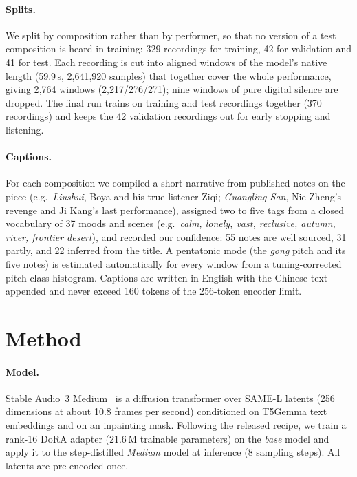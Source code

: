 \documentclass[11pt]{article}
\begin{document}
\paragraph{Splits.} We split by composition rather than by performer, so that no version of a test composition is
heard in training: 329 recordings for training, 42 for validation and 41 for test. Each recording is cut into
aligned windows of the model's native length (59.9\,s, 2{,}641{,}920 samples) that together cover the whole
performance, giving 2{,}764 windows (2{,}217/276/271); nine windows of pure digital silence are dropped. The
final run trains on training and test recordings together (370 recordings) and keeps the 42 validation
recordings out for early stopping and listening.

\paragraph{Captions.} For each composition we compiled a short narrative from published notes on the piece
(e.g.\ \textit{Liushui}, Boya and his true listener Ziqi; \textit{Guangling San}, Nie Zheng's revenge and Ji
Kang's last performance), assigned two to five tags from a closed vocabulary of 37 moods and scenes (e.g.\
\textit{calm, lonely, vast, reclusive, autumn, river, frontier desert}), and recorded our confidence: 55 notes are
well sourced, 31 partly, and 22 inferred from the title. A pentatonic mode (the \emph{gong} pitch and its five
notes) is estimated automatically for every window from a tuning-corrected pitch-class histogram. Captions are
written in English with the Chinese text appended and never exceed 160 tokens of the 256-token encoder limit.

\section{Method}\label{sec:method}

\paragraph{Model.} Stable Audio~3 Medium~\citep{evans2026stableaudio3} is a diffusion transformer over SAME-L
latents (256 dimensions at about 10.8 frames per second) conditioned on T5Gemma text embeddings and on an
inpainting mask. Following the released recipe, we train a rank-16 DoRA adapter (21.6\,M trainable parameters)
on the \emph{base} model and apply it to the step-distilled \emph{Medium} model at inference (8 sampling steps).
All latents are pre-encoded once.
\end{document}
